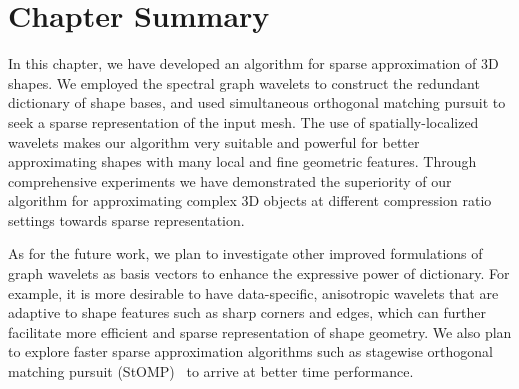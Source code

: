 \section{Chapter Summary}

In this chapter, we have developed an algorithm for sparse 
approximation of 3D shapes. We employed the spectral graph wavelets to
construct the redundant dictionary of shape bases, and used
simultaneous orthogonal matching pursuit to seek a sparse
representation of the input mesh. The use of spatially-localized
wavelets makes our algorithm very suitable and powerful for better
approximating shapes with many local and fine geometric features.
Through comprehensive experiments we have demonstrated the superiority
of our algorithm for approximating complex 3D objects at different
compression ratio settings towards sparse representation.

As for the future work, we plan to investigate other
improved formulations of graph wavelets as basis vectors to enhance
the expressive power of dictionary. For example, it is more desirable
to have data-specific, anisotropic wavelets that are adaptive to shape
features such as sharp corners and edges, which can further facilitate
more efficient and sparse representation of shape geometry. We also
plan to explore faster sparse approximation algorithms such as
stagewise orthogonal matching pursuit (StOMP)~\cite{Donoho2012} to
arrive at better time performance. 